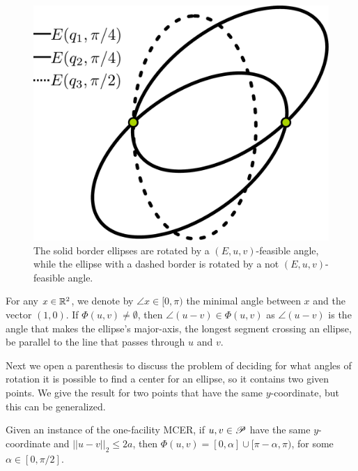 
\begin{figure}[H]
	\centering
	\includegraphics[scale=.22]{figures/feasible-angle2}
	\caption{The solid border ellipses are rotated by a $(E, u,v)$-feasible angle, while the ellipse with a dashed border is rotated by a not $(E, u, v)$-feasible angle.}
	\label{fig:feasible-angle}
\end{figure}

For any $x\in\mathbb{R}^2$, we denote by $\angle x\in [0, \pi)$ the minimal angle between $x$ and the vector $(1, 0)$. If $\Phi(u,v)\neq\emptyset$, then $\angle(u-v)\in  \Phi(u,v)$ as $\angle(u-v)$ is the angle that makes the ellipse's major-axis, the longest segment crossing an ellipse, be parallel to the line that passes through $u$ and $v$.

Next we open a parenthesis to discuss the problem of deciding for what angles of rotation it is possible to find a center for an ellipse, so it contains two given points. We give the result for two points that have the same $y$-coordinate, but this can be generalized.

\begin{lem}\label{lema:l-function}
	Given an instance of the one-facility MCER, if $u, v \in \mathscr{P}$ have the same $y$-coordinate and $||u-v||_2 \le 2a$, then $\Phi(u,v) = [0, \alpha] \cup [\pi - \alpha, \pi)$, for some $\alpha \in [0, \pi/2]$.
\end{lem}

